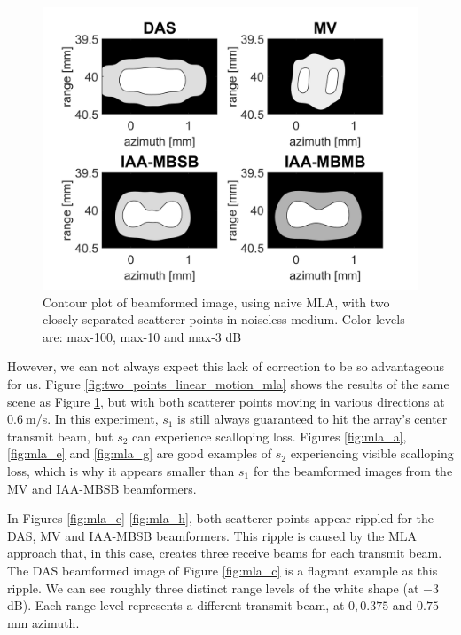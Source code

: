 \begin{figure}[ht]
    \centering
    \includegraphics[width=\linewidth]{./images/results/4/two_points_static_mla.png}
	\caption{Contour plot of beamformed image, using naive MLA, with two closely-separated scatterer points in noiseless medium. Color levels are:  max-100, max-10 and max-3 dB}
	\label{fig:two_points_static_mla}
\end{figure}

However, we can not always expect this lack of correction to be so advantageous for us.
Figure \ref{fig:two_points_linear_motion_mla} shows the results of the same scene as Figure \ref{fig:two_points_static_mla}, but with both scatterer points moving in various directions at $0.6~$m/s.
In this experiment, $s_1$ is still always guaranteed to hit the array's center transmit beam, but $s_2$ can experience scalloping loss.
Figures \ref{fig:mla_a}, \ref{fig:mla_e} and \ref{fig:mla_g} are good examples of $s_2$ experiencing visible scalloping loss, which is why it appears smaller than $s_1$ for the beamformed images from the MV and IAA-MBSB beamformers.

In Figures \ref{fig:mla_c}-\ref{fig:mla_h}, both scatterer points appear rippled for the DAS, MV and IAA-MBSB beamformers. This ripple is caused by the MLA approach that, in this case, creates three receive beams for each transmit beam.
The DAS beamformed image of Figure \ref{fig:mla_c} is a flagrant example as this ripple. We can see roughly three distinct range levels of the white shape (at $-3~$dB). Each range level represents a different transmit beam, at $0, 0.375$ and $0.75~$mm azimuth.

